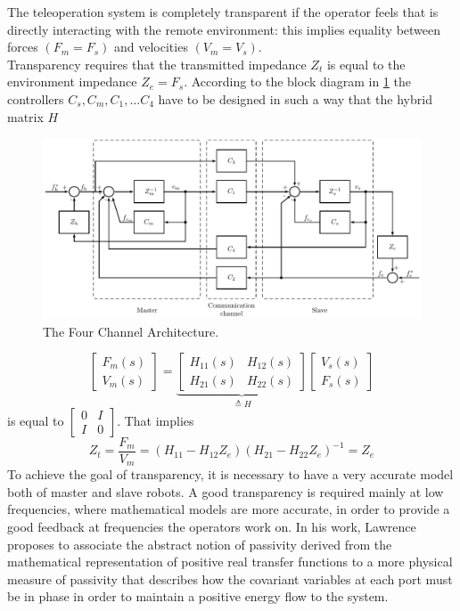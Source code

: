 The teleoperation system is completely transparent if the operator feels that is
directly interacting with the remote environment: this implies equality between  forces $(F_{m} = F_{s})$ and velocities $(V_{m} = V_{s})$.\\
Transparency requires that the transmitted impedance $Z_{t}$ is equal to the
environment impedance $Z_{e} = F_{s}$. According to the block diagram in \figurename{\ref{sch:Four_channel}} the controllers $C_{s},C_{m},C_{1}, \dots C_{4}$ have to be designed in such a way that the hybrid matrix $H$
\begin{figure}
	\includegraphics[width=\textwidth]{schemas/Four_channel.pdf}
	\caption[The Four Channel Architecture]{The Four Channel Architecture.}
	\label{sch:Four_channel}
\end{figure}
\begin{equation}
	\begin{bmatrix}
		F_{m}(s)\\
		V_{m}(s)
	\end{bmatrix}
	= 
	\underbrace{
		\begin{bmatrix}
			H_{11}(s) & H_{12}(s)\\
			H_{21}(s) & H_{22}(s)
		\end{bmatrix}
	}_{\text{$\triangleq H$}}
	\begin{bmatrix}
		V_{s}(s)\\
		F_{s}(s)
	\end{bmatrix}
\end{equation}
is equal to $\begin{bmatrix} 0 & I\\ I & 0 \end{bmatrix}$.\newpage
\noindent That implies
\begin{equation}
	Z_{t} = \dfrac{F_{m}}{V_{m}} = \left( H_{11} -H_{12}Z_{e}\right) \left(  H_{21} -H_{22}Z_{e}\right)^{-1} = Z_{e}
\end{equation}
To achieve the goal of transparency, it is necessary to have a very accurate model both of master and slave robots.
A good transparency is required mainly at low frequencies, where mathematical models are more accurate, in order to provide a good feedback at frequencies the operators work on.
In his work, Lawrence proposes to associate the abstract notion of passivity derived from the mathematical representation of positive real transfer functions to a more physical measure of passivity that describes how the covariant variables at each port must be in phase in order to maintain a positive energy flow to the system.

